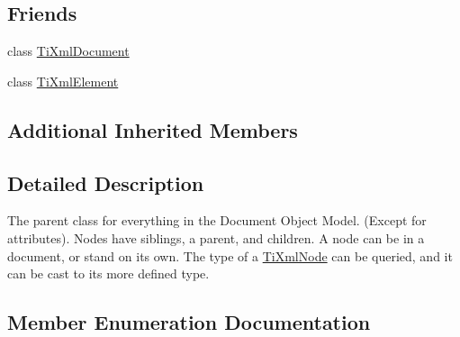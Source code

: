 \subsection*{Friends}
\begin{DoxyCompactItemize}
\item 
class \hyperlink{class_ti_xml_node_a173617f6dfe902cf484ce5552b950475}{Ti\+Xml\+Document}
\item 
class \hyperlink{class_ti_xml_node_ab6592e32cb9132be517cc12a70564c4b}{Ti\+Xml\+Element}
\end{DoxyCompactItemize}
\subsection*{Additional Inherited Members}


\subsection{Detailed Description}
The parent class for everything in the Document Object Model. (Except for attributes). Nodes have siblings, a parent, and children. A node can be in a document, or stand on its own. The type of a \hyperlink{class_ti_xml_node}{Ti\+Xml\+Node} can be queried, and it can be cast to its more defined type. 

\subsection{Member Enumeration Documentation}
